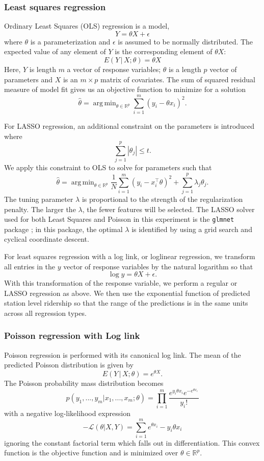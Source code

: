 \documentclass[11pt]{article}
\DeclareMathOperator*{\argmin}{arg\,min}
\begin{document}
\subsubsection{Least squares regression}\label{sec:ols}

Ordinary Least Squares (OLS) regression is a model,
\[Y = \theta X + \epsilon\] where $\theta$ is a parameterization and $\epsilon$ is assumed to be normally distributed. The expected value of any element of $Y$ is the corresponding element of $\theta X$:
\[E(Y\,|\,X; \theta) = \theta X\]
Here, $Y$ is length $m$ a vector of response variables; $\theta$ is a length $p$ vector of parameters and $X$ is an $m\times p$ matrix of covariates. The sum of squared residual measure of model fit gives us an objective function to minimize for a solution
\[\hat{\theta} = \argmin_{\theta\in\mathbb{R}^p}\sum_{i=1}^m \left(y_i - \theta x_i\right)^2.\]

For LASSO regression, an additional constraint on the parameters is introduced where 
\[\sum_{j=1}^p |\theta_j|\leq t.\] We apply this constraint to OLS to solve for parameters such that
\[\hat{\theta} = \argmin_{\theta\in\mathbb{R}^p} \frac{1}{N}\sum_{i=1}^m \left(y_i - x_i^\top\theta\right)^2 + \sum_{j=1}^p\lambda_j\theta_j.\]
The tuning parameter $\lambda$ is proportional to the strength of the regularization penalty. The larger the $\lambda$, the fewer features will be selected. The LASSO solver used for both Least Squares and Poisson in this experiment is the \texttt{glmnet} package \cite{glmnet}; in this package, the optimal $\lambda$ is identified by using a grid search and cyclical coordinate descent.  

For least squares regression with a log link, or loglinear regression, we transform all entries in the $y$ vector of response variables by the natural logarithm so that 
$$\log{y} = \theta X + \epsilon.$$
With this transformation of the response variable, we perform a regular or LASSO regression as above. We then use the exponential function of predicted station level ridership so that the range of the predictions is in the same units across all regression types.

\subsubsection{Poisson regression with Log link}

Poisson regression is performed with its canonical log link. The mean of the predicted Poisson distribution is given by 
\[E(Y\,|\,X;\theta) = e^{\theta X}.\]
The Poisson probability mass distribution becomes
\[p(y_1, ..., y_m|x_1, ..., x_m; \theta) = \prod_{i=1}^m \frac{e^{y_i\theta x_i}e^{-e^{\theta x_i}}}{y_i!}\]
with a negative log-likelihood expression
\[-\mathcal{L}(\theta|X, Y) = \sum_{i=1}^m e^{\theta x_i}-y_i\theta x_i \]
ignoring the constant factorial term which falls out in differentiation. This convex function is the objective function and is minimized over $\theta\in\mathbb{R}^p$.
\end{document}
